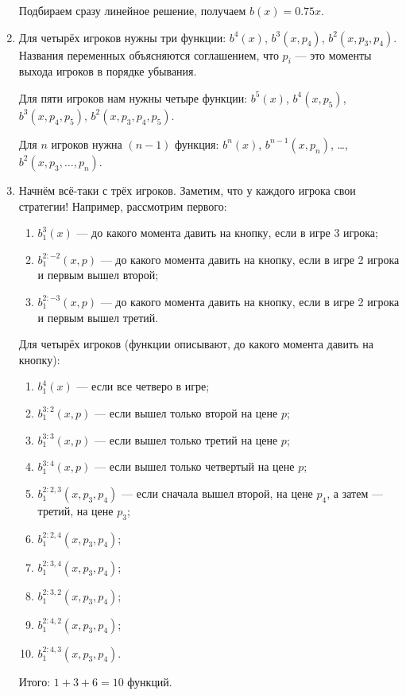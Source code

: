 \begin{enumerate}
Подбираем сразу линейное решение, получаем $ b(x)=0.75x $.

\item Для четырёх игроков нужны три функции: $ b^{4}(x) $, $ b^{3}(x,p_{4}) $, $ b^{2}(x,p_{3},p_{4}) $. Названия переменных объясняются соглашением, что $ p_{i} $ — это моменты выхода игроков в порядке убывания.

Для пяти игроков нам нужны четыре функции: $ b^{5}(x) $, $ b^{4}(x,p_{5}) $, $ b^{3}(x,p_{4},p_{5}) $, $ b^{2}(x,p_{3},p_{4},p_{5}) $.

Для $ n $ игроков нужна $ (n-1) $ функция: $ b^{n}(x) $, $ b^{n-1}(x,p_{n}) $, \ldots, $ b^{2}(x, p_{3}, \ldots, p_{n}) $.

\item Начнём всё-таки с трёх игроков. Заметим, что у каждого игрока свои стратегии! Например, рассмотрим первого:
\begin{enumerate}
\item $b_{1}^{3}(x)$ — до какого момента давить на кнопку, если в игре 3 игрока;
\item $b_{1}^{2:-2}(x,p) $ — до какого момента давить на кнопку, если в игре 2 игрока и первым вышел второй;
\item $b_{1}^{2:-3}(x,p) $ — до какого момента давить на кнопку, если в игре 2 игрока и первым вышел третий.
\end{enumerate}

Для четырёх игроков (функции описывают, до какого момента давить на кнопку):
\begin{enumerate}
\item $b_{1}^{4}(x)$ — если все четверо в игре;
\item $b_{1}^{3:2}(x,p) $ — если вышел только второй на цене $ p $;
\item $b_{1}^{3:3}(x,p) $ — если вышел только третий на цене $ p $;
\item $b_{1}^{3:4}(x,p) $ — если вышел только четвертый на цене $ p $;

\item $b_{1}^{2:2,3}(x,p_{3},p_{4}) $ — если сначала вышел второй, на цене $ p_{4} $, а затем — третий, на цене $ p_{3} $;
\item $b_{1}^{2:2,4}(x,p_{3},p_{4}) $;
\item $b_{1}^{2:3,4}(x,p_{3},p_{4}) $;
\item $b_{1}^{2:3,2}(x,p_{3},p_{4}) $;
\item $b_{1}^{2:4,2}(x,p_{3},p_{4}) $;
\item $b_{1}^{2:4,3}(x,p_{3},p_{4}) $.
\end{enumerate}
Итого: $1+3+6=10$ функций.


\end{enumerate}
